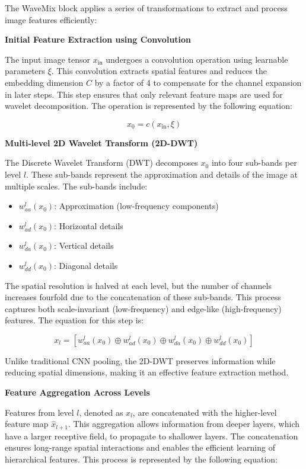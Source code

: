 The WaveMix block applies a series of transformations to extract and process image features efficiently\cite{jeevan2024wavemix}:

\textbf{Initial Feature Extraction using Convolution}

The input image tensor \( x_{\text{in}} \) undergoes a convolution operation using learnable parameters \( \xi \). This convolution extracts spatial features and reduces the embedding dimension \( C \) by a factor of 4 to compensate for the channel expansion in later steps. This step ensures that only relevant feature maps are used for wavelet decomposition. The operation is represented by the following equation:

\[
x_0 = c(x_{\text{in}}, \xi)
\]

\textbf{Multi-level 2D Wavelet Transform (2D-DWT)}

The Discrete Wavelet Transform (DWT) decomposes \( x_0 \) into four sub-bands per level \( l \). These sub-bands represent the approximation and details of the image at multiple scales. The sub-bands include:
\begin{itemize}
    \item \( w^l_{aa}(x_0) \): Approximation (low-frequency components)
    \item \( w^l_{ad}(x_0) \): Horizontal details
    \item \( w^l_{da}(x_0) \): Vertical details
    \item \( w^l_{dd}(x_0) \): Diagonal details
\end{itemize}
The spatial resolution is halved at each level, but the number of channels increases fourfold due to the concatenation of these sub-bands. This process captures both scale-invariant (low-frequency) and edge-like (high-frequency) features. The equation for this step is:

\[
x_l = \left[w^l_{aa}(x_0) \oplus w^l_{ad}(x_0) \oplus w^l_{da}(x_0) \oplus w^l_{dd}(x_0) \right]
\]

Unlike traditional CNN pooling, the 2D-DWT preserves information while reducing spatial dimensions, making it an effective feature extraction method.

\textbf{Feature Aggregation Across Levels}

Features from level \( l \), denoted as \( x_l \), are concatenated with the higher-level feature map \( \hat{x}_{l+1} \). This aggregation allows information from deeper layers, which have a larger receptive field, to propagate to shallower layers. The concatenation ensures long-range spatial interactions and enables the efficient learning of hierarchical features. This process is represented by the following equation:


